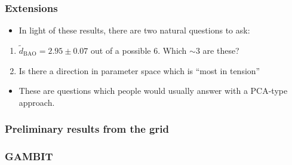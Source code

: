 \documentclass[aspectratio=169, handout]{beamer}
\begin{document}
\begin{frame}
    \frametitle{Extensions}
    \begin{itemize}
        \item In light of these results, there are two natural questions to ask:
    \end{itemize}
    \begin{enumerate}
        \item $\tilde{d}_\text{BAO} = 2.95 \pm  0.07 $ out of a possible 6. Which $\sim 3$ are these?
        \item Is there a direction in parameter space which is ``most in tension''
    \end{enumerate}
    \begin{itemize}
        \item These are questions which people would usually answer with a PCA-type approach.
    \end{itemize}
\end{frame}



\begin{frame}
    \frametitle{Preliminary results from the grid}
\end{frame}




\begin{frame}
    \frametitle{GAMBIT}
\end{frame}
\end{document}
